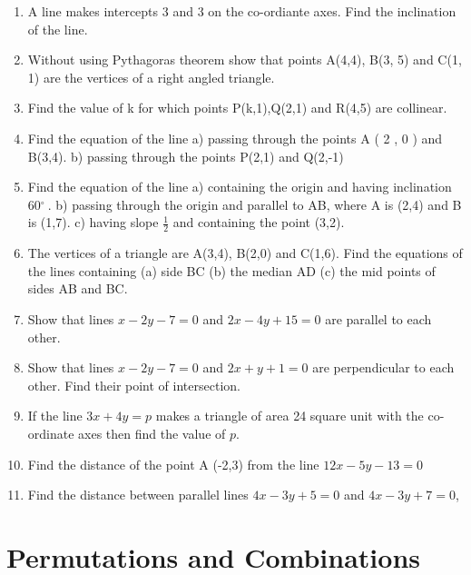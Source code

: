 \documentclass[14pt]{article}
\newcommand{\degree}{$^{\circ}\ $} %
\begin{document}
\begin{multicols}{2}
\begin{enumerate}[resume]
\item A line makes intercepts 3 and 3 on the
co-ordiante axes. Find the inclination of
the line.

\item Without using Pythagoras theorem show
that points A(4,4), B(3, 5) and C(1, 1)
are the vertices of a right angled triangle.

\item Find the value of k for which points
P(k,1),Q(2,1) and R(4,5) are collinear.

\item Find the equation of the line a) passing through the points A ( 2 , 0 ) and
B(3,4). b) passing through the points P(2,1) and
Q(2,-1)

\item Find the equation of the line a) containing the
origin and having inclination 60\degree. b) passing through the origin and parallel to AB, where A is (2,4) and B is (1,7). c) having slope $\frac{1}{2}$
and containing the point (3,2).

\item The vertices of a triangle are A(3,4), B(2,0)
and C(1,6). Find the equations of the lines containing (a) side BC (b) the median AD (c) the mid points of sides AB and BC.

\item Show that lines $x-2y-7=0$ and $2x-4y+15=0$ are parallel to each other.

\item Show that lines $x - 2 y - 7 =0$ and 
$2x + y + 1 = 0$ are perpendicular to each
other. Find their point of intersection.

\item If the line $3 x + 4 y = p$ makes a triangle
of area 24 square unit with the co-ordinate
axes then find the value of $p$.

\item Find the distance of the point A (-2,3) from the line $12 x - 5 y - 13 = 0$

\item Find the distance between parallel lines
$4x - 3 y + 5 = 0$ and $4x - 3y + 7 = 0$,


\end{enumerate} 






\section{Permutations and Combinations}
\noindent
\begin{enumerate}[resume]
  

\end{enumerate}
\end{multicols}
\end{document}
